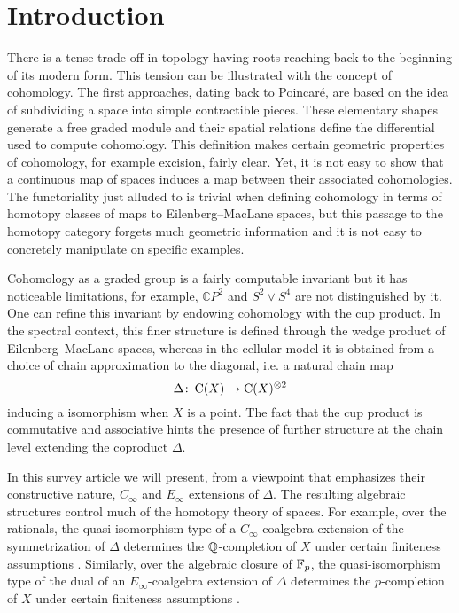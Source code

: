 
\section{Introduction} \label{s:introduction}

There is a tense trade-off in topology having roots reaching back to the beginning of its modern form.
This tension can be illustrated with the concept of cohomology.
The first approaches, dating back to Poincar\'e, are based on the idea of subdividing a space into simple contractible pieces.
These elementary shapes generate a free graded module and their spatial relations define the differential used to compute cohomology.
This definition makes certain geometric properties of cohomology, for example excision, fairly clear.
Yet, it is not easy to show that a continuous map of spaces induces a map between their associated cohomologies.
The functoriality just alluded to is trivial when defining cohomology in terms of homotopy classes of maps to Eilenberg--MacLane spaces, but this passage to the homotopy category forgets much geometric information and it is not easy to concretely manipulate on specific examples.

Cohomology as a graded group is a fairly computable invariant but it has noticeable limitations, for example, $\mathbb{C} P^2$ and $S^2 \vee S^4$ are not distinguished by it.
One can refine this invariant by endowing cohomology with the cup product.
In the spectral context, this finer structure is defined through the wedge product of Eilenberg--MacLane spaces, whereas in the cellular model it is obtained from a choice of chain approximation to the diagonal, i.e. a natural chain map
\begin{equation} \label{e:chain diagonal}
\Delta \colon \operatorname{C}(X) \to \operatorname{C}(X)^{\otimes 2}
\end{equation}
inducing a isomorphism when $X$ is a point.
The fact that the cup product is commutative and associative hints the presence of further structure at the chain level extending the coproduct $\Delta$.

In this survey article we will present, from a viewpoint that emphasizes their constructive nature, $C_\infty$ and $E_\infty$ extensions of $\Delta$.
The resulting algebraic structures control much of the homotopy theory of spaces.
For example, over the rationals, the quasi-isomorphism type of a $C_\infty$-coalgebra extension of the symmetrization of $\Delta$ determines the $\mathbb{Q}$-completion of $X$ under certain finiteness assumptions \cite{quillen1969rational}.
Similarly, over the algebraic closure of ${\mathbb{F}_p}$, the quasi-isomorphism type of the dual of an $E_\infty$-coalgebra extension of $\Delta$ determines the $p$-completion of $X$ under certain finiteness assumptions \cite{mandell2001padic}.

